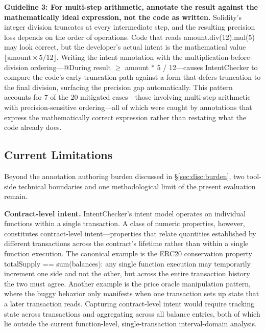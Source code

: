 \documentclass[pdflatex,sn-basic]{sn-jnl}%
\theoremstyle{thmstyleone}%
\theoremstyle{thmstyletwo}%
\theoremstyle{thmstylethree}%
\begin{document}
\smallskip
\noindent\textbf{Guideline 3: For multi-step arithmetic, annotate the result against the mathematically ideal expression, not the code as written.}
Solidity's integer division truncates at every intermediate step, and the resulting precision loss depends on the order of operations.
Code that reads amount.div(12).mul(5) may look correct, but the developer's actual intent is the mathematical value $\lfloor\text{amount} \times 5 / 12\rfloor$.
Writing the intent annotation with the multiplication-before-division ordering---@During result $\geq$ amount * 5 / 12---causes IntentChecker to compare the code's early-truncation path against a form that defers truncation to the final division, surfacing the precision gap automatically.
This pattern accounts for 7 of the 20 mitigated cases---those involving multi-step arithmetic with precision-sensitive ordering---all of which were caught by annotations that express the mathematically correct expression rather than restating what the code already does.

\subsection{Current Limitations}\label{sec:disc:tech}

Beyond the annotation authoring burden discussed in §\ref{sec:disc:burden}, two tool-side technical boundaries and one methodological limit of the present evaluation remain.

\smallskip
\noindent\textbf{Contract-level intent.}
IntentChecker's intent model operates on individual functions within a single transaction.
A class of numeric properties, however, constitutes contract-level intent---properties that relate quantities established by different transactions across the contract's lifetime rather than within a single function execution.
The canonical example is the ERC20 conservation property totalSupply == sum(balances): any single function execution may temporarily increment one side and not the other, but across the entire transaction history the two must agree.
Another example is the price oracle manipulation pattern, where the buggy behavior only manifests when one transaction sets up state that a later transaction reads.
Capturing contract-level intent would require tracking state across transactions and aggregating across all balance entries, both of which lie outside the current function-level, single-transaction interval-domain analysis.
\end{document}
